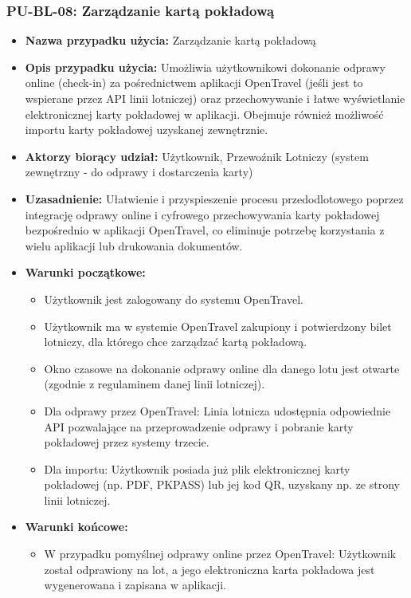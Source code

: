 \documentclass[a4paper,12pt]{article}
\begin{document}
\subsubsection{PU-BL-08: Zarządzanie kartą pokładową}
\begin{itemize}
    \item \textbf{Nazwa przypadku użycia:} Zarządzanie kartą pokładową
    \item \textbf{Opis przypadku użycia:} Umożliwia użytkownikowi dokonanie odprawy online (check-in) za pośrednictwem aplikacji OpenTravel (jeśli jest to wspierane przez API linii lotniczej) oraz przechowywanie i łatwe wyświetlanie elektronicznej karty pokładowej w aplikacji. Obejmuje również możliwość importu karty pokładowej uzyskanej zewnętrznie.
    \item \textbf{Aktorzy biorący udział:} Użytkownik, Przewoźnik Lotniczy (system zewnętrzny - do odprawy i dostarczenia karty)
    \item \textbf{Uzasadnienie:} Ułatwienie i przyspieszenie procesu przedodlotowego poprzez integrację odprawy online i cyfrowego przechowywania karty pokładowej bezpośrednio w aplikacji OpenTravel, co eliminuje potrzebę korzystania z wielu aplikacji lub drukowania dokumentów.
    \item \textbf{Warunki początkowe:}
        \begin{itemize}
            \item Użytkownik jest zalogowany do systemu OpenTravel.
            \item Użytkownik ma w systemie OpenTravel zakupiony i potwierdzony bilet lotniczy, dla którego chce zarządzać kartą pokładową.
            \item Okno czasowe na dokonanie odprawy online dla danego lotu jest otwarte (zgodnie z regulaminem danej linii lotniczej).
            \item Dla odprawy przez OpenTravel: Linia lotnicza udostępnia odpowiednie API pozwalające na przeprowadzenie odprawy i pobranie karty pokładowej przez systemy trzecie.
            \item Dla importu: Użytkownik posiada już plik elektronicznej karty pokładowej (np. PDF, PKPASS) lub jej kod QR, uzyskany np. ze strony linii lotniczej.
        \end{itemize}
    \item \textbf{Warunki końcowe:}
        \begin{itemize}
            \item W przypadku pomyślnej odprawy online przez OpenTravel: Użytkownik został odprawiony na lot, a jego elektroniczna karta pokładowa jest wygenerowana i zapisana w aplikacji.

\end{itemize}
\end{itemize}
\end{document}
